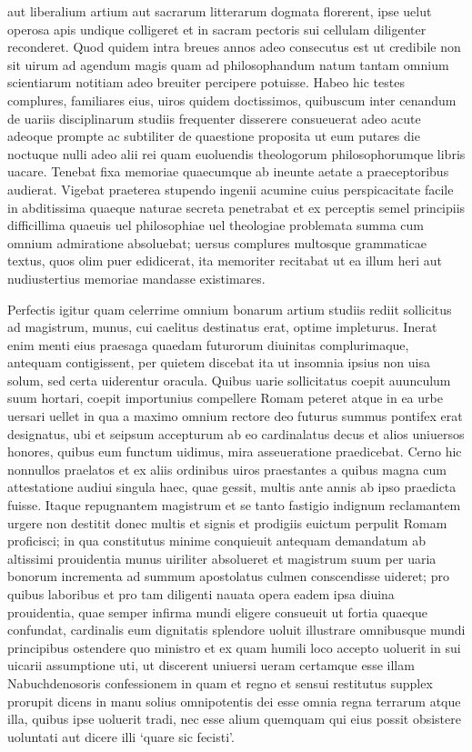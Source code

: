 \documentclass[a5paper,twoside]{article}
\begin{document}
aut liberalium artium aut sacrarum litterarum dogmata florerent, ipse uelut operosa apis undique colligeret et in sacram pectoris sui cellulam diligenter reconderet. Quod quidem intra breues annos adeo consecutus est ut credibile non sit uirum ad agendum magis quam ad philosophandum natum tantam omnium scientiarum notitiam adeo breuiter percipere potuisse. Habeo hic testes complures, familiares eius, uiros quidem doctissimos, quibuscum inter cenandum de uariis disciplinarum studiis frequenter disserere consueuerat adeo acute adeoque prompte ac subtiliter de quaestione proposita ut eum putares die noctuque nulli adeo alii rei quam euoluendis theologorum philosophorumque libris uacare. Tenebat fixa memoriae quaecumque ab ineunte aetate a praeceptoribus audierat. Vigebat praeterea stupendo ingenii acumine cuius perspicacitate facile in abditissima quaeque naturae secreta penetrabat et ex perceptis semel principiis difficillima quaeuis uel philosophiae uel theologiae problemata summa cum omnium admiratione absoluebat; uersus complures multosque grammaticae textus, quos olim puer edidicerat, ita memoriter recitabat ut ea illum heri aut nudiustertius memoriae mandasse existimares. 

Perfectis igitur quam celerrime omnium bonarum artium studiis rediit sollicitus ad magistrum, munus, cui caelitus destinatus erat, optime impleturus.  Inerat enim menti eius praesaga quaedam futurorum diuinitas complurimaque, antequam contigissent, per quietem discebat ita ut insomnia ipsius non uisa solum, sed certa uiderentur oracula. Quibus uarie sollicitatus coepit auunculum suum hortari, coepit importunius compellere Romam peteret atque in ea urbe uersari uellet in qua a maximo omnium rectore deo futurus summus pontifex erat designatus, ubi et seipsum accepturum ab eo cardinalatus decus et alios uniuersos honores, quibus eum functum uidimus, mira asseueratione praedicebat. Cerno hic nonnullos praelatos et ex aliis ordinibus uiros praestantes a quibus magna cum attestatione audiui singula haec, quae gessit, multis ante annis ab ipso praedicta fuisse.  Itaque repugnantem magistrum et se tanto fastigio indignum reclamantem urgere non destitit donec multis et signis et prodigiis euictum perpulit Romam proficisci; in qua constitutus minime conquieuit antequam demandatum ab altissimi prouidentia munus uiriliter absolueret et magistrum suum per uaria bonorum incrementa ad summum apostolatus culmen conscendisse uideret; pro quibus laboribus et pro tam diligenti nauata opera eadem ipsa diuina prouidentia, quae semper infirma mundi eligere consueuit ut fortia quaeque confundat, cardinalis eum dignitatis splendore uoluit illustrare omnibusque mundi principibus ostendere quo ministro et ex quam humili loco accepto uoluerit in sui uicarii assumptione uti, ut discerent uniuersi ueram certamque esse illam Nabuchdenosoris confessionem in quam et regno et sensui restitutus supplex prorupit dicens in manu solius omnipotentis dei esse omnia regna terrarum atque illa, quibus ipse uoluerit tradi, nec esse alium quemquam qui eius possit obsistere uoluntati aut dicere illi `quare sic fecisti'.
\end{document}
